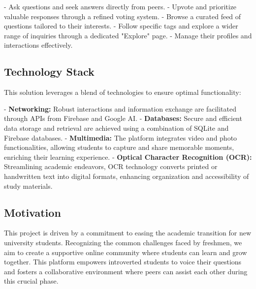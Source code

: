 - Ask questions and seek answers directly from peers.
- Upvote and prioritize valuable responses through a refined voting system.
- Browse a curated feed of questions tailored to their interests.
- Follow specific tags and explore a wider range of inquiries through a dedicated "Explore" page.
- Manage their profiles and interactions effectively.

\subsection{Technology Stack}

This solution leverages a blend of technologies to ensure optimal functionality:

- \textbf{Networking:} Robust interactions and information exchange are facilitated through APIs from Firebase and Google AI.
- \textbf{Databases:} Secure and efficient data storage and retrieval are achieved using a combination of SQLite and Firebase databases.
- \textbf{Multimedia:} The platform integrates video and photo functionalities, allowing students to capture and share memorable moments, enriching their learning experience.
- \textbf{Optical Character Recognition (OCR):} Streamlining academic endeavors, OCR technology converts printed or handwritten text into digital formats, enhancing organization and accessibility of study materials.

\subsection{Motivation}

This project is driven by a commitment to easing the academic transition for new university students. Recognizing the common challenges faced by freshmen, we aim to create a supportive online community where students can learn and grow together. This platform empowers introverted students to voice their questions and fosters a collaborative environment where peers can assist each other during this crucial phase.





